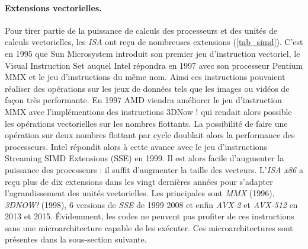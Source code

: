 \paragraph{Extensions vectorielles.}
Pour tirer partie de la puissance de calculs des processeurs et des unités de calculs vectorielles, les \textit{ISA} ont reçu de nombreuses extensions (\autoref{tab_simd}).
C'est en 1995 que Sun Microsystem introduit son premier jeu d'instruction vectoriel, le Visual Instruction Set auquel Intel répondra en 1997 avec son processeur Pentium MMX et le jeu d'instructions du même nom. Ainsi ces instructions pouvaient réaliser des opérations sur les jeux de données tels que les images ou vidéos de façon très performante. En 1997 AMD viendra améliorer le jeu d'instruction MMX avec l'implémentions des instructions 3DNow ! qui rendait alors possible les opérations vectorielles sur les nombres flottants. La possibilité de faire une opération sur deux nombres flottant par cycle doublait alors la performance des processeurs. Intel répondit alors à cette avance avec le jeu d'instructions Streaming SIMD Extensions (SSE) en 1999. Il est alors facile d'augmenter la puissance des processeurs : il suffit d'augmenter la taille des vecteurs.
L'\textit{ISA x86} a reçu plus de dix extensions dans les vingt dernières années pour s'adapter l'agrandissement des unités vectorielles. Les principales sont \textit{MMX} (1996), \textit{3DNOW!} (1998), 6 versions de \textit{SSE} de 1999 2008 et enfin \textit{AVX-2} et \textit{AVX-512} en 2013 et 2015. Évidemment, les codes ne peuvent pas profiter de ces instructions sans une microarchitecture capable de les exécuter. Ces microarchitectures sont présentes dans la sous-section suivante. 


